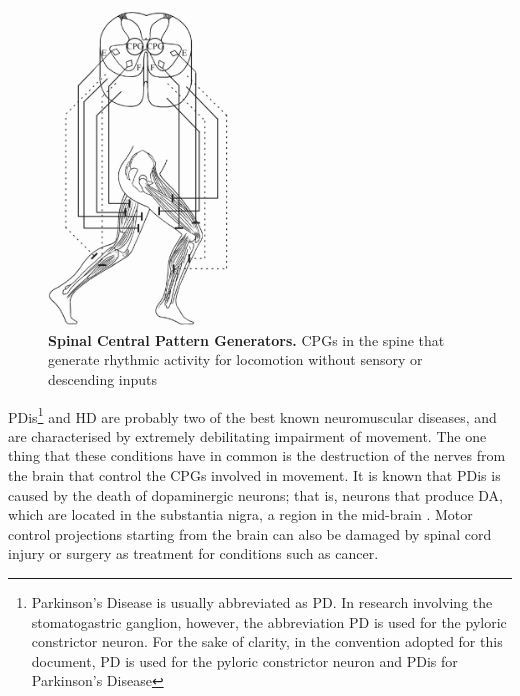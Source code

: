 \begin{figure}[H]
	\centering 
		\includegraphics[width=5cm]{graphics/cpg_in_walking0.png}
		\caption[Spinal Central Pattern Generators.]{\textbf{Spinal Central Pattern Generators.} \acp{CPG} in the spine that generate rhythmic activity for locomotion without sensory or descending inputs \cite{Lacquaniti1999}}
		\label{fig:cpg_in_walking}
\end{figure}

\ac{PDis}\footnote{Parkinson's Disease is usually abbreviated as PD. In research involving the stomatogastric ganglion, however, the abbreviation PD is used for the pyloric constrictor neuron. For the sake of clarity, in the convention adopted for this document, PD is used for the pyloric constrictor neuron and PDis for Parkinson's Disease} and \ac{HD} are probably two of the best known neuromuscular diseases, and are characterised by extremely debilitating impairment of movement. The one thing that these conditions have in common is the destruction of the nerves from the brain that control the \acp{CPG} involved in movement. It is known that \ac{PDis} is caused by the death of dopaminergic neurons; that is, neurons that produce \ac{DA}, which are located in the substantia nigra, a region in the mid-brain \cite{Jankovic2008}. Motor control projections starting from the brain can also be damaged by spinal cord injury or surgery as treatment for conditions such as cancer. %


